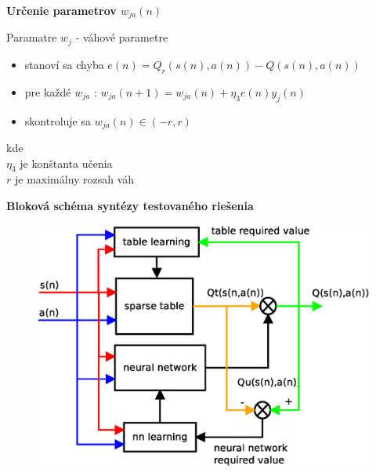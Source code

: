 \documentclass[xcolor=dvipsnames]{beamer}
\begin{document}
\begin{frame}{\bf Určenie parametrov $w_{ja}(n)$}

Paramatre $w_{j}$ - váhové parametre

\begin{itemize}
\item stanoví sa chyba $e(n) = Q_r(s(n), a(n)) - Q(s(n), a(n))$
\item pre každé $w_{ja}$ : $w_{ja}(n+1)= w_{ja}(n) + \eta_3 e(n)y_j(n)$
\item skontroluje sa $w_{ja}(n) \in (-r, r)$
\end{itemize}

kde \\
$\eta_3$ je konštanta učenia \\
$r$ je maximálny rozsah váh \\
\end{frame}


\begin{frame}{\bf Bloková schéma syntézy testovaného riešenia}

\begin{figure}[!htb]
\centering
\includegraphics[scale=.4]{../diagrams/q_learning_hybrid.eps}
\end{figure}

\end{frame}
\end{document}
